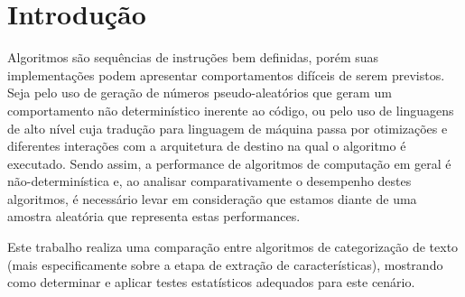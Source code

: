 \documentclass[conference]{IEEEtran}
\begin{document}

\section{Introdução}
\label{sec:intro}

Algoritmos são sequências de instruções bem definidas, porém suas implementações podem apresentar comportamentos difíceis de serem previstos.
Seja pelo uso de geração de números pseudo-aleatórios que geram um comportamento não determinístico inerente ao código, ou pelo uso de linguagens de alto nível cuja tradução para linguagem de máquina passa por otimizações e diferentes interações com a arquitetura de destino na qual o algoritmo é executado.
Sendo assim, a performance de algoritmos de computação em geral é não-determinística e, ao analisar comparativamente o desempenho destes algoritmos, é necessário levar em consideração que estamos diante de uma amostra aleatória que representa estas performances.

Este trabalho realiza uma comparação entre algoritmos de categorização de texto (mais especificamente sobre a etapa de extração de características), mostrando como determinar e aplicar testes estatísticos adequados para este cenário.
\end{document}
